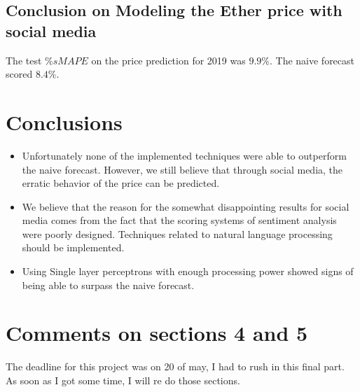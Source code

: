\subsection{Conclusion on Modeling the Ether price with social media}

The test $\%sMAPE$ on the price prediction for 2019  was $9.9\%$. The naive forecast scored $8.4\%$.


\section{Conclusions}



\begin{itemize}
	\item Unfortunately none of the implemented techniques were able to outperform the naive forecast. However, we still believe that through social media, the erratic behavior of the price can be predicted.
	\item We believe that the reason for the somewhat disappointing results for social media comes from the fact that the scoring systems of sentiment analysis were poorly designed. Techniques related to natural language processing should be implemented.
	\item Using Single layer perceptrons with enough processing power showed signs of being able to surpass the naive forecast.
\end{itemize}

\section{Comments on sections 4 and 5}
The deadline for this project was on 20 of may, I had to rush in this final part. As soon as I got some time, I will re do those sections.




